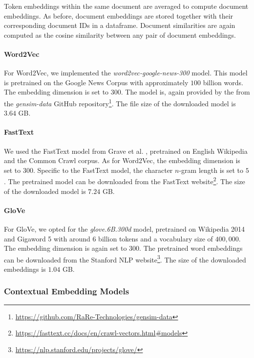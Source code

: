 Token embeddings within the same document are averaged to compute document embeddings. As before, document embeddings are stored together with their corresponding document IDs in a dataframe. Document similarities are again computed as the cosine similarity between any pair of document embeddings.

\paragraph{Word2Vec}

For Word2Vec, we implemented the \emph{word2vec-google-news-300} model. This model is pretrained on the Google News Corpus \cite{MikolovEfficientEstimation2013} with approximately $100$ billion words. The embedding dimension is set to $300$.
The model is, again provided by the from the \emph{gensim-data} GitHub repository\footnote{\url{https://github.com/RaRe-Technologies/gensim-data}}. The file size of the downloaded model is $3.64$ GB.

\paragraph{FastText}

We used the FastText model from Grave et al. \cite{GraveLearningWord2018}, pretrained on English Wikipedia and the Common Crawl corpus. As for Word2Vec, the embedding dimension is set to $300$. Specific to the FastText model, the character $n$-gram length is set to $5$.
The pretrained model can be downloaded from the FastText website\footnote{\url{https://fasttext.cc/docs/en/crawl-vectors.html\#models}}. The size of the downloaded model is $7.24$ GB.

\paragraph{GloVe}

For GloVe, we opted for the \emph{glove.6B.300d} model, pretrained on Wikipedia 2014 and Gigaword 5 \cite{PenningtonGloveGlobal2014} with around $6$ billion tokens and a vocabulary size of $400,000$. The embedding dimension is again set to $300$. The pretrained word embeddings can be downloaded from the Stanford NLP website\footnote{\url{https://nlp.stanford.edu/projects/glove/}}. The size of the downloaded embeddings is $1.04$ GB.


\subsubsection*{Contextual Embedding Models}

